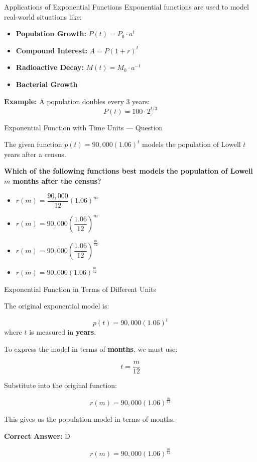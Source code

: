 \documentclass{beamer}
\begin{document}
\begin{frame}{Applications of Exponential Functions}
\small
Exponential functions are used to model real-world situations like:

\begin{itemize}
    \item \textbf{Population Growth:} $P(t) = P_0 \cdot a^t$
    \item \textbf{Compound Interest:} $A = P(1 + r)^t$
    \item \textbf{Radioactive Decay:} $M(t) = M_0 \cdot a^{-t}$
    \item \textbf{Bacterial Growth}
\end{itemize}

\vspace{0.3cm}
\textbf{Example:} A population doubles every 3 years:
\[
P(t) = 100 \cdot 2^{t/3}
\]
\end{frame}



\begin{frame}{Exponential Function with Time Units — Question}
\small

The given function $p(t) = 90,\!000(1.06)^t$ models the population of Lowell $t$ years after a census.

\textbf{Which of the following functions best models the population of Lowell $m$ months after the census?}

\vspace{0.3cm}
\begin{itemize}
    \item[A.] \( r(m) = \dfrac{90,\!000}{12}(1.06)^m \)
    \item[B.] \( r(m) = 90,\!000 \left( \dfrac{1.06}{12} \right)^m \)
    \item[C.] \( r(m) = 90,\!000 \left( \dfrac{1.06}{12} \right)^{\frac{m}{12}} \)
    \item[D.] \( r(m) = 90,\!000(1.06)^{\frac{m}{12}} \)
\end{itemize}
\end{frame}




\begin{frame}{Exponential Function in Terms of Different Units}
\small

The original exponential model is:

\[
p(t) = 90{,}000(1.06)^t
\]
where $t$ is measured in \textbf{years}.

\vspace{0.3cm}
To express the model in terms of \textbf{months}, we must use:

\[
t = \frac{m}{12}
\]

Substitute into the original function:

\[
r(m) = 90{,}000(1.06)^{\frac{m}{12}}
\]

This gives us the population model in terms of months.

\vspace{0.3cm}
\textbf{Correct Answer:} D

\[
\boxed{r(m) = 90{,}000(1.06)^{\frac{m}{12}}}
\]



\end{frame}
\end{document}
